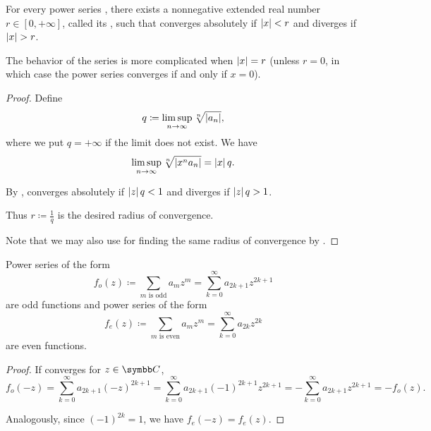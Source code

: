 \begin{theorem}\label{thm:power_series_radius_of_convergence}
  For every power series , there exists a nonnegative extended real number \( r \in [0, +\infty] \), called its , such that  converges absolutely if \( \left\vert x \right\vert < r \) and diverges if \( \left\vert x \right\vert > r \).

  The behavior of the series is more complicated when \( \left\vert x \right\vert = r \) (unless \( r = 0 \), in which case the power series converges if and only if \( x = 0 \)).
\end{theorem}
\begin{proof}
  Define
  \begin{equation*}
    q \coloneqq \limsup_{n \to \infty} \sqrt[n]{\left\vert a_n \right\vert},
  \end{equation*}
  where we put \( q = +\infty \) if the limit does not exist. We have
  \begin{equation*}
    \limsup_{n \to \infty} \sqrt[n]{\left\vert x^n a_n \right\vert} = \left\vert x \right\vert q.
  \end{equation*}

  By ,  converges absolutely if \( \left\vert z \right\vert q < 1 \) and diverges if \( \left\vert z \right\vert q > 1 \).

  Thus \( r \coloneqq \tfrac 1 q \) is the desired radius of convergence.

  Note that we may also use  for finding the same radius of convergence by .
\end{proof}

\begin{proposition}\label{thm:power_series_parity}
  Power series of the form
  \begin{equation}\label{thm:power_series_parity/odd}
    f_o(z) \coloneqq \sum_{m \text{ is odd}} a_m z^m = \sum_{k=0}^\infty a_{2k+1} z^{2k+1}
  \end{equation}
  are odd functions and power series of the form
  \begin{equation}\label{thm:power_series_parity/even}
    f_e(z) \coloneqq \sum_{m \text{ is even}} a_m z^m = \sum_{k=0}^\infty a_{2k} z^{2k}
  \end{equation}
  are even functions.
\end{proposition}
\begin{proof}
  If  converges for \( z \in \BC \),
  \begin{equation*}
    f_o(-z)
    =
    \sum_{k=0}^\infty a_{2k+1} (-z)^{2k+1}
    =
    \sum_{k=0}^\infty a_{2k+1} (-1)^{2k+1} z^{2k+1}
    =
    - \sum_{k=0}^\infty a_{2k+1} z^{2k+1}
    =
    - f_o(z).
  \end{equation*}

  Analogously, since \( (-1)^{2k} = 1 \), we have \( f_e(-z) = f_e(z) \).
\end{proof}

